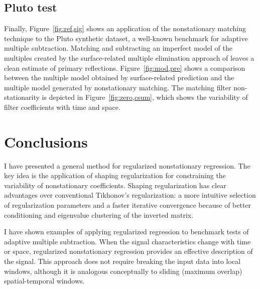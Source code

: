 \subsection{Pluto test}



 

Finally, Figure~\ref{fig:ref,sig} shows an application of the
nonstationary matching technique to the Pluto synthetic dataset, a
well-known benchmark for adaptive multiple subtraction. Matching and
subtracting an imperfect model of the multiples created by the
surface-related multiple elimination approach of
\cite{GEO57-09-11661177} leaves a clean estimate of primary
reflections.  Figure~\ref{fig:mod,pre} shows a comparison between the
multiple model obtained by surface-related prediction and the multiple
model generated by nonstationary matching. The matching filter
non-stationarity is depicted in Figure~\ref{fig:zero,csum}, which
shows the variability of filter coefficients with time and space.

\section{Conclusions}

I have presented a general method for regularized nonstationary
regression. The key idea is the application of shaping regularization
for constraining the variability of nonstationary
coefficients. Shaping regularization has clear advantages over
conventional Tikhonov's regularization: a more intuitive selection of
regularization parameters and a faster iterative convergence because
of better conditioning and eigenvalue clustering of the inverted matrix.

I have shown examples of applying regularized regression to benchmark
tests of adaptive multiple subtraction. When the signal
characteristics change with time or space, regularized nonstationary
regression provides an effective description of the signal. This
approach does not require breaking the input data into local windows,
although it is analogous conceptually to sliding (maximum overlap)
spatial-temporal windows.

